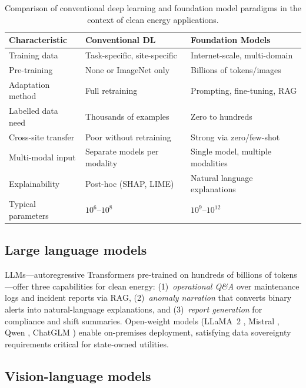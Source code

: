 \documentclass[preprint,12pt]{elsarticle}
\begin{document}
\begin{table}[htbp]
\centering
\caption{Comparison of conventional deep learning and foundation model paradigms in the context of clean energy applications.}
\label{tab:fm_vs_dl}
\small
\begin{tabular}{@{}p{3.2cm}p{5cm}p{5cm}@{}}
\toprule
\textbf{Characteristic} & \textbf{Conventional DL} & \textbf{Foundation Models} \\
\midrule
Training data & Task-specific, site-specific & Internet-scale, multi-domain \\
Pre-training & None or ImageNet only & Billions of tokens/images \\
Adaptation method & Full retraining & Prompting, fine-tuning, RAG \\
Labelled data need & Thousands of examples & Zero to hundreds \\
Cross-site transfer & Poor without retraining & Strong via zero/few-shot \\
Multi-modal input & Separate models per modality & Single model, multiple modalities \\
Explainability & Post-hoc (SHAP, LIME) & Natural language explanations \\
Typical parameters & $10^6$--$10^8$ & $10^9$--$10^{12}$ \\
\bottomrule
\end{tabular}
\end{table}

\subsection{Large language models}
\label{subsec:llm}

LLMs---autoregressive Transformers pre-trained on hundreds of billions of tokens \cite{brown2020language, achiam2023gpt4, devlin2019bert}---offer three capabilities for clean energy: (1)~\textit{operational Q\&A} over maintenance logs and incident reports via RAG, (2)~\textit{anomaly narration} that converts binary alerts into natural-language explanations, and (3)~\textit{report generation} for compliance and shift summaries. Open-weight models (LLaMA~2 \cite{touvron2023llama2}, Mistral \cite{jiang2023mistral}, Qwen \cite{bai2023qwen}, ChatGLM \cite{du2022glm, zeng2023glm130b}) enable on-premises deployment, satisfying data sovereignty requirements critical for state-owned utilities.

\subsection{Vision-language models}
\label{subsec:vlm}
\end{document}
